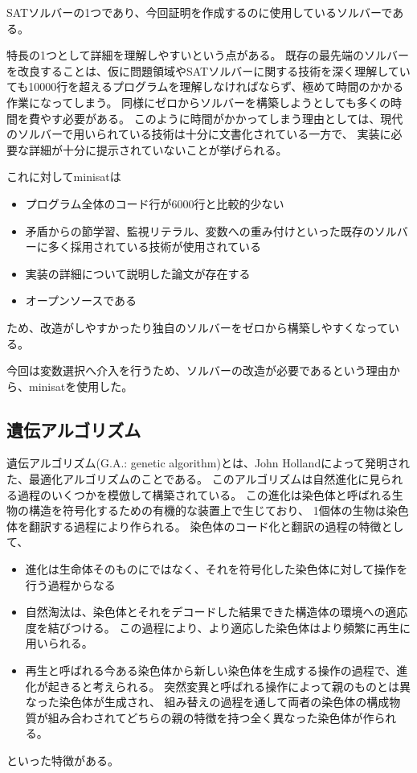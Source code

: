 \documentclass[titlepage]{jsarticle}
\begin{document}
SATソルバーの1つであり、今回証明を作成するのに使用しているソルバーである。

特長の1つとして詳細を理解しやすいという点がある。
既存の最先端のソルバーを改良することは、仮に問題領域やSATソルバーに関する技術を深く理解していても10000行を超えるプログラムを理解しなければならず、極めて時間のかかる作業になってしまう。
同様にゼロからソルバーを構築しようとしても多くの時間を費やす必要がある。
このように時間がかかってしまう理由としては、現代のソルバーで用いられている技術は十分に文書化されている一方で、
実装に必要な詳細が十分に提示されていないことが挙げられる。

これに対してminisatは
\begin{itemize}
	\item プログラム全体のコード行が6000行と比較的少ない
	\item 矛盾からの節学習、監視リテラル、変数への重み付けといった既存のソルバーに多く採用されている技術が使用されている
	\item 実装の詳細について説明した論文が存在する
	\item オープンソースである
\end{itemize}
ため、改造がしやすかったり独自のソルバーをゼロから構築しやすくなっている。

今回は変数選択へ介入を行うため、ソルバーの改造が必要であるという理由から、minisatを使用した。





\subsection{遺伝アルゴリズム}



遺伝アルゴリズム(G.A.: genetic algorithm)とは、John Hollandによって発明された、最適化アルゴリズムのことである。
このアルゴリズムは自然進化に見られる過程のいくつかを模倣して構築されている。
この進化は染色体と呼ばれる生物の構造を符号化するための有機的な装置上で生じており、
1個体の生物は染色体を翻訳する過程により作られる。
染色体のコード化と翻訳の過程の特徴として、
\begin{itemize}
	\item {進化は生命体そのものにではなく、それを符号化した染色体に対して操作を行う過程からなる}
	\item {自然淘汰は、染色体とそれをデコードした結果できた構造体の環境への適応度を結びつける。
	この過程により、より適応した染色体はより頻繁に再生に用いられる。}
	\item{再生と呼ばれる今ある染色体から新しい染色体を生成する操作の過程で、進化が起きると考えられる。
	突然変異と呼ばれる操作によって親のものとは異なった染色体が生成され、
	組み替えの過程を通して両者の染色体の構成物質が組み合わされてどちらの親の特徴を持つ全く異なった染色体が作られる。}
\end{itemize}
といった特徴がある。
\end{document}
